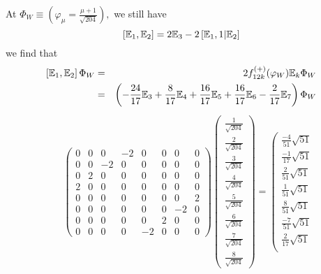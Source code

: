 \documentclass[a4paper,12pt]{book}
\begin{document}
At $\Phi _{W}\equiv \left( \varphi _{\mu }=\frac{\mu +1}{\sqrt{204}}\right)
, $ we still have 
\begin{equation}
\left[ \Bbb{E}_{1},\Bbb{E}_{2}\right] =2\Bbb{E}_{3}-2\left[ \Bbb{E}_{1},1|%
\Bbb{E}_{2}\right]
\end{equation}
we find that 
\begin{eqnarray*}
\left[ \Bbb{E}_{1},\Bbb{E}_{2}\right] \Phi _{W} &=&2f_{12k}^{\left( +\right)
}(\varphi _{W})\Bbb{E}_{k}\Phi _{W} \\
&=&\left( -\frac{24}{17}\Bbb{E}_{3}+\frac{8}{17}\Bbb{E}_{4}+\frac{16}{17}%
\Bbb{E}_{5}+\frac{16}{17}\Bbb{E}_{6}-\frac{2}{17}\Bbb{E}_{7}\right) \Phi _{W}
\end{eqnarray*}
\begin{eqnarray*}
&&\left( 
\begin{array}{llllllll}
0 & 0 & 0 & -2 & 0 & 0 & 0 & 0 \\ 
0 & 0 & -2 & 0 & 0 & 0 & 0 & 0 \\ 
0 & 2 & 0 & 0 & 0 & 0 & 0 & 0 \\ 
2 & 0 & 0 & 0 & 0 & 0 & 0 & 0 \\ 
0 & 0 & 0 & 0 & 0 & 0 & 0 & 2 \\ 
0 & 0 & 0 & 0 & 0 & 0 & -2 & 0 \\ 
0 & 0 & 0 & 0 & 0 & 2 & 0 & 0 \\ 
0 & 0 & 0 & 0 & -2 & 0 & 0 & 0
\end{array}
\right) \left( 
\begin{array}{l}
\frac{1}{\sqrt{204}} \\ 
\frac{2}{\sqrt{204}} \\ 
\frac{3}{\sqrt{204}} \\ 
\frac{4}{\sqrt{204}} \\ 
\frac{5}{\sqrt{204}} \\ 
\frac{6}{\sqrt{204}} \\ 
\frac{7}{\sqrt{204}} \\ 
\frac{8}{\sqrt{204}}
\end{array}
\right) =\left( 
\begin{array}{l}
\frac{-4}{51}\sqrt{51} \\ 
\frac{-1}{17}\sqrt{51} \\ 
\frac{2}{51}\sqrt{51} \\ 
\frac{1}{51}\sqrt{51} \\ 
\frac{8}{51}\sqrt{51} \\ 
\frac{-7}{51}\sqrt{51} \\ 
\frac{2}{17}\sqrt{51} \\ 

\end{array}
\end{eqnarray*}
\end{document}
